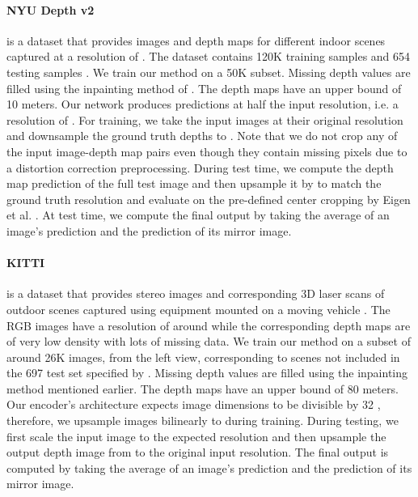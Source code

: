 \documentclass[10pt,twocolumn,letterpaper]{article}
\begin{document}
\paragraph{NYU Depth v2} is a dataset that provides images and depth maps for different indoor scenes captured at a resolution of  \cite{Silberman2012}. The dataset contains 120K training samples and 654 testing samples \cite{Eigen2014}. We train our method on a 50K subset. Missing depth values are filled using the inpainting method of \cite{Levin2004}. The depth maps have an upper bound of 10 meters. Our network produces predictions at half the input resolution, i.e. a resolution of . For training, we take the input images at their original resolution and downsample the ground truth depths to . Note that we do not crop any of the input image-depth map pairs even though they contain missing pixels due to a distortion correction preprocessing. During test time, we compute the depth map prediction of the full test image and then upsample it by  to match the ground truth resolution and evaluate on the pre-defined center cropping by Eigen et al. \cite{Eigen2014}. At test time, we compute the final output by taking the average of an image's prediction and the prediction of its mirror image.

\paragraph{KITTI} is a dataset that provides stereo images and corresponding 3D laser scans of outdoor scenes captured using equipment mounted on a moving vehicle \cite{geiger2013vision}. The RGB images have a resolution of around  while the corresponding depth maps are of very low density with lots of missing data. We train our method on a subset of around 26K images, from the left view, corresponding to scenes not included in the 697 test set specified by \cite{Eigen2014}. Missing depth values are filled using the inpainting method mentioned earlier. The depth maps have an upper bound of 80 meters. Our encoder's architecture expects image dimensions to be divisible by 32 \cite{huang2017densely}, therefore, we upsample images bilinearly to  during training. During testing, we first scale the input image to the expected resolution and then upsample the output depth image from  to the original input resolution. The final output is computed by taking the average of an image's prediction and the prediction of its mirror image.
\end{document}
